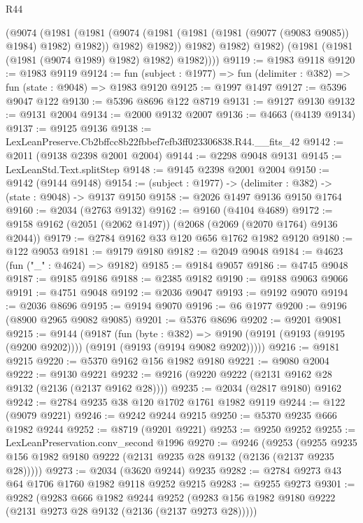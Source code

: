 \begin{lexlean}{R44}
\begin{coremodule}
                (@9074
                  (@1981
                    (@1981
                      (@9074 (@1981 (@1981 (@1981 (@9077 (@9083 @9085)) @1984) @1982) @1982))
                      @1982)
                    @1982))
                @1982)
              @1982)
            @1982)
          (@1981 (@1981 (@1981 (@9074 @1989) @1982) @1982) @1982))))
@9119 := @1983 @9118
@9120 := @1983 @9119
@9124 := fun (subject : @1977) => fun (delimiter : @382) => fun (state : @9048) => @1983 @9120
@9125 := @1997 @1497
@9127 := @5396 @9047 @122
@9130 := @5396 @8696 @122 @8719
@9131 := @9127 @9130
@9132 := @9131 @2004
@9134 := @2000 @9132 @2007
@9136 := @4663 (@4139 @9134)
@9137 := @9125 @9136
@9138 := LexLeanPreserve.Cb2bffcc8b22fbbef7efb3ff023306838.R44.__fits_42
@9142 := @2011 (@9138 @2398 @2001 @2004)
@9144 := @2298 @9048 @9131
@9145 := LexLeanStd.Text.splitStep
@9148 := @9145 @2398 @2001 @2004
@9150 := @9142 (@9144 @9148)
@9154 := (subject : @1977) -> (delimiter : @382) -> (state : @9048) -> @9137 @9150
@9158 := @2026 @1497 @9136 @9150 @1764
@9160 := @2034 (@2763 @9132)
@9162 := @9160 (@4104 @4689)
@9172 := @9158 @9162 (@2051 (@2062 @1497)) (@2068 (@2069 (@2070 @1764) @9136 @2044))
@9179 := @2784 @9162 @33 @120 @656 @1762 @1982 @9120
@9180 := @122 @9053
@9181 := @9179 @9180
@9182 := @2049 @9048
@9184 := @4623 (fun ("_" : @4624) => @9182)
@9185 := @9184 @9057
@9186 := @4745 @9048
@9187 := @9185 @9186
@9188 := @2385 @9182
@9190 := @9188 @9063 @9066
@9191 := @4751 @9048
@9192 := @2036 @9047
@9193 := @9192 @9070
@9194 := @2036 @8696
@9195 := @9194 @9070
@9196 := @6 @1977
@9200 := @9196 (@8900 @2965 @9082 @9085)
@9201 := @5376 @8696
@9202 := @9201 @9081
@9215 := @9144
    (@9187
      (fun (byte : @382) =>
      @9190 (@9191 (@9193 (@9195 (@9200 @9202)))) (@9191 (@9193 (@9194 @9082 @9202)))))
@9216 := @9181 @9215
@9220 := @5370 @9162 @156 @1982 @9180
@9221 := @9080 @2004
@9222 := @9130 @9221
@9232 := @9216 (@9220 @9222 (@2131 @9162 @28 @9132 (@2136 (@2137 @9162 @28))))
@9235 := @2034 (@2817 @9180) @9162
@9242 := @2784 @9235 @38 @120 @1702 @1761 @1982 @9119
@9244 := @122 (@9079 @9221)
@9246 := @9242 @9244 @9215
@9250 := @5370 @9235 @666 @1982 @9244
@9252 := @8719 (@9201 @9221)
@9253 := @9250 @9252
@9255 := LexLeanPreservation.conv_second @1996
@9270 := @9246
    (@9253 (@9255 @9235 @156 @1982 @9180 @9222 (@2131 @9235 @28 @9132 (@2136 (@2137 @9235 @28)))))
@9273 := @2034 (@3620 @9244) @9235
@9282 := @2784 @9273 @43 @64 @1706 @1760 @1982 @9118 @9252 @9215
@9283 := @9255 @9273
@9301 := @9282
    (@9283
      @666
      @1982
      @9244
      @9252
      (@9283 @156 @1982 @9180 @9222 (@2131 @9273 @28 @9132 (@2136 (@2137 @9273 @28)))))

\end{coremodule}
\end{lexlean}
